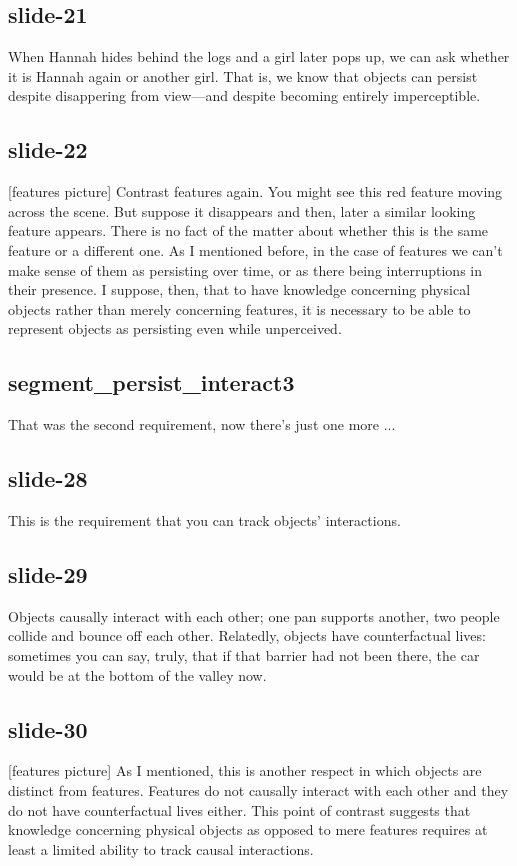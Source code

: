 \documentclass[12pt,\papersize]{extarticle}
\begin{document}
\subsection{slide-21}
When Hannah hides behind the logs and a girl later pops up, we can ask whether it is Hannah 
again or another girl.
That is, we know that objects can persist despite disappering from view---and despite becoming 
entirely imperceptible.
 
\subsection{slide-22}
[features picture]
Contrast features again.  You might see this red feature moving across the scene. 
But suppose it disappears and then, later a similar looking feature appears. 
There is no fact of the matter about whether this is the same feature or a different one.
As I mentioned before, in the case of features we can't make sense of them as persisting over 
time, or as there being interruptions in their presence.
I suppose, then, that to have knowledge concerning physical objects rather than merely 
concerning features, it is necessary to be able to represent objects as persisting
even while unperceived.
 
\subsection{segment\_persist\_interact3}
That was the second requirement, now there's just one more ...
 
\subsection{slide-28}
This is the requirement that you can track objects' interactions.
 
\subsection{slide-29}
Objects causally interact with each other; one pan supports another, two people collide and 
bounce off each other.  Relatedly, objects have counterfactual lives: sometimes you can say,
truly, that if that barrier had not been there, the car would be at the bottom of the valley 
now.
 
\subsection{slide-30}
[features picture]
As I mentioned, this is another respect in which objects are distinct from features.
Features do not causally interact with each other and they do not have counterfactual lives 
either.
This point of contrast suggests that knowledge concerning physical objects as opposed to mere
features requires at least a limited ability to track causal interactions.
 
\end{document}
